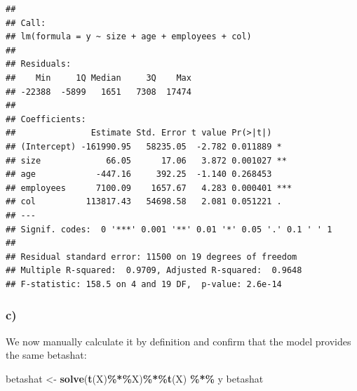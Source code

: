 \documentclass[
]{article}
\newenvironment{Shaded}{\begin{snugshade}}{\end{snugshade}}
\newcommand{\FunctionTok}[1]{\textcolor[rgb]{0.13,0.29,0.53}{\textbf{#1}}}
\newcommand{\NormalTok}[1]{#1}
\newcommand{\OtherTok}[1]{\textcolor[rgb]{0.56,0.35,0.01}{#1}}
\newcommand{\SpecialCharTok}[1]{\textcolor[rgb]{0.81,0.36,0.00}{\textbf{#1}}}
\begin{document}
\begin{Shaded}
\end{Shaded}

\begin{verbatim}
## 
## Call:
## lm(formula = y ~ size + age + employees + col)
## 
## Residuals:
##    Min     1Q Median     3Q    Max 
## -22388  -5899   1651   7308  17474 
## 
## Coefficients:
##               Estimate Std. Error t value Pr(>|t|)    
## (Intercept) -161990.95   58235.05  -2.782 0.011889 *  
## size             66.05      17.06   3.872 0.001027 ** 
## age            -447.16     392.25  -1.140 0.268453    
## employees      7100.09    1657.67   4.283 0.000401 ***
## col          113817.43   54698.58   2.081 0.051221 .  
## ---
## Signif. codes:  0 '***' 0.001 '**' 0.01 '*' 0.05 '.' 0.1 ' ' 1
## 
## Residual standard error: 11500 on 19 degrees of freedom
## Multiple R-squared:  0.9709, Adjusted R-squared:  0.9648 
## F-statistic: 158.5 on 4 and 19 DF,  p-value: 2.6e-14
\end{verbatim}

\subsubsection{c)}\label{c-1}

We now manually calculate it by definition and confirm that the model
provides the same betashat:

\begin{Shaded}
\begin{Highlighting}[]
\NormalTok{betashat }\OtherTok{\textless{}{-}} \FunctionTok{solve}\NormalTok{(}\FunctionTok{t}\NormalTok{(X)}\SpecialCharTok{\%*\%}\NormalTok{X)}\SpecialCharTok{\%*\%}\FunctionTok{t}\NormalTok{(X) }\SpecialCharTok{\%*\%}\NormalTok{ y}
\NormalTok{betashat}
\end{Highlighting}
\end{Shaded}
\end{document}
